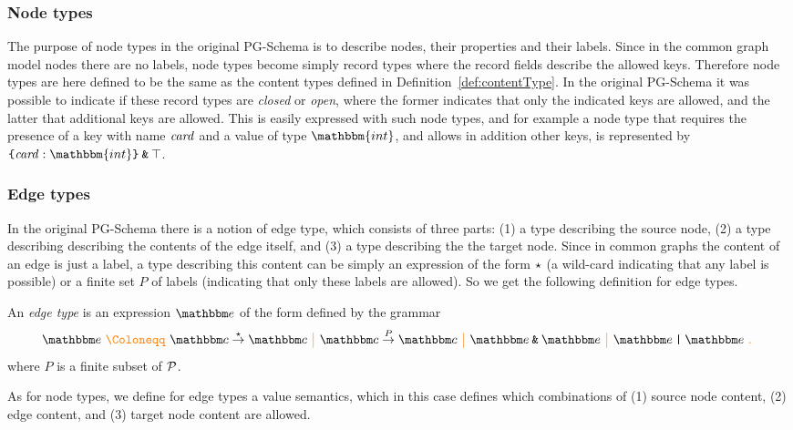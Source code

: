 \subsubsection{Node types}

The purpose of node types in the original PG-Schema is to describe nodes, their properties and their labels. 
Since in the common graph model nodes there are no labels, node types become simply record types
where the record fields describe the allowed keys.
Therefore node types are here defined to be the same as the content types defined in Definition~\ref{def:contentType}.
In the original PG-Schema it was possible to indicate if these record types are \emph{closed} or \emph{open},
where the former indicates that only the indicated keys are allowed, and the latter that additional keys
are allowed. This is easily expressed with such node types, and for example a node type that requires the presence of a key with name $\mathit{card}$ and a value of type $\mathbbm{int}$, and allows in addition other keys, is represented by $\closedRT{\excard : \mathbbm{int}} \tAnd \top$.

\subsubsection{Edge types}

In the original PG-Schema there is a notion of edge type, which consists of three parts: 
(1) a type describing the source node, (2) a type describing describing the contents of the edge itself, and (3) a type describing the the target node.
Since in common graphs the content of an edge is just a label, a type describing this content can be simply an expression of the form $\star$ (a wild-card indicating that any label is possible) or a finite set $P$ of labels (indicating that only these labels are allowed). 
So we get the following definition for edge types.

\begin{definition}
An \emph{edge type} is an expression $\etype$ of the form defined by the grammar
$$\etype \gDef \et{\ntype}{\pwc}{\ntype} \gMid \et{\ntype}{P}{\ntype} \gMid  \etype \tAnd \etype  \gMid  \etype \tOr \etype  \gEnd $$
where $P$ is a finite subset of $\mathcal{P}$.
\end{definition}

As for node types, we define for edge types a value semantics, which in this case defines which combinations of (1) source node content, (2) edge content, and (3) target node content are allowed. 

